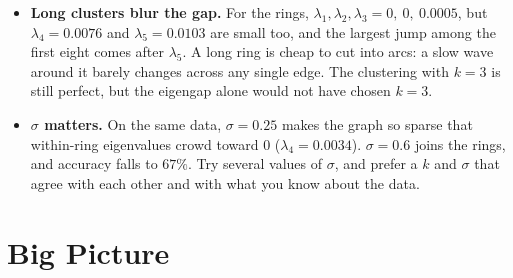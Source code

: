 \documentclass[11pt]{article}
\begin{document}
\begin{careful}
\begin{itemize}[nosep,leftmargin=*]
\item \textbf{Long clusters blur the gap.} For the rings, $\lambda_1,\lambda_2,\lambda_3=0,\ 0,\ 0.0005$, but $\lambda_4=0.0076$ and $\lambda_5=0.0103$ are small too, and the largest jump among the first eight comes after $\lambda_5$. A long ring is cheap to cut into arcs: a slow wave around it barely changes across any single edge. The clustering with $k=3$ is still perfect, but the eigengap alone would not have chosen $k=3$.
\item \textbf{$\sigma$ matters.} On the same data, $\sigma=0.25$ makes the graph so sparse that within-ring eigenvalues crowd toward $0$ ($\lambda_4=0.0034$). $\sigma=0.6$ joins the rings, and accuracy falls to $67\%$. Try several values of $\sigma$, and prefer a $k$ and $\sigma$ that agree with each other and with what you know about the data.
\end{itemize}
\end{careful}

\clearpage
\section{Big Picture}
\end{document}

